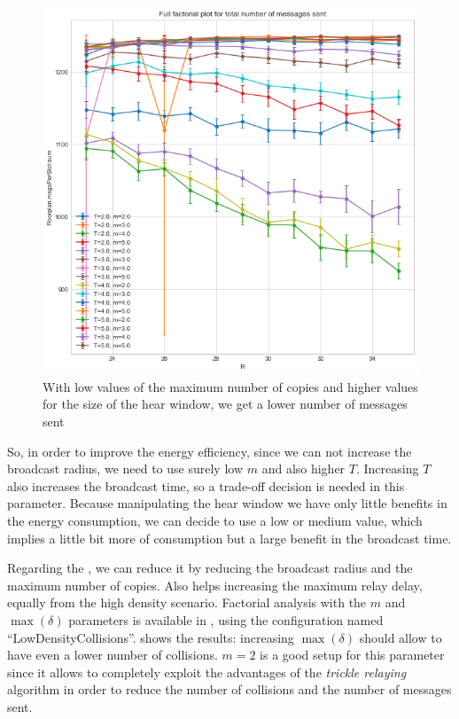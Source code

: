 \begin{figure}
	\centering
	\includegraphics[width=\textwidth]{img/ld/messages-R-ffplot.png}
	\caption{With low values of the maximum number of copies and higher
	values for the size of the hear window, we get a lower number of
	messages sent}\label{fig:ldmessagesff}
\end{figure}

So, in order to improve the energy efficiency, since we can not increase the
broadcast radius, we need to use surely low \(m\) and also higher \(T\).
Increasing \(T\) also increases the broadcast time, so a trade-off decision is
needed in this parameter. Because manipulating the hear window we have only
little benefits in the energy consumption, we can decide to use a low or medium
value, which implies a little bit more of consumption but a large benefit in the
broadcast time.

Regarding the , we can reduce it by
reducing the broadcast radius and the maximum number of copies. Also helps
increasing the maximum relay delay, equally from the high density scenario.
Factorial analysis with the \(m\) and \(\max(\delta)\) parameters is available
in , using the configuration named
``LowDensityCollisions''.  shows the results:
increasing \(\max(\delta)\) should allow to have even a lower number of
collisions. \(m\!=\!2\) is a good setup for this parameter since it allows to
completely exploit the advantages of the \emph{trickle relaying} algorithm in
order to reduce the number of collisions and the number of messages sent.

